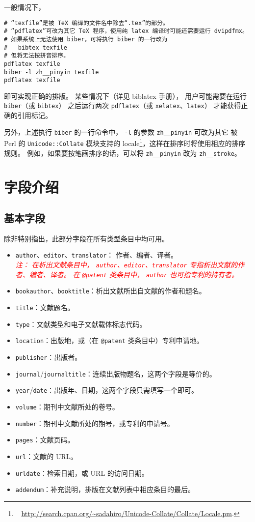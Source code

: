 \documentclass[UTF8, fancyhdr, hyperref]{ctexart}
\newcommand{\myemph}[1]{\emph{\textcolor{red}{#1}}}
\begin{document}
一般情况下，
\begin{Verbatim}[frame = single]
# “texfile”是被 TeX 编译的文件名中除去“.tex”的部分。
# “pdflatex”可改为其它 TeX 程序，使用纯 latex 编译时可能还需要运行 dvipdfmx。
# 如果系统上无法使用 biber，可将执行 biber 的一行改为
#   bibtex texfile
# 但将无法按拼音排序。
pdflatex texfile
biber -l zh__pinyin texfile
pdflatex texfile
\end{Verbatim}
即可实现正确的排版。
某些情况下（详见 biblatex 手册\supercite{biblatex}），
用户可能需要在运行 \verb|biber|（或 \verb|bibtex|）
之后运行两次 \verb|pdflatex|（或 \verb|xelatex|、\verb|latex|）
才能获得正确的引用标记。

另外，上述执行 \verb|biber| 的一行命令中，
\verb|-l| 的参数 \verb|zh__pinyin| 可改为其它
被 Perl 的 \verb|Unicode::Collate| 模块支持的 locale\footnote{\ %
	\url{http://search.cpan.org/~sadahiro/Unicode-Collate/Collate/Locale.pm}.%
}，这样在排序时将使用相应的排序规则。
例如，如果要按笔画排序的话，可以将 \verb|zh__pinyin| 改为 \verb|zh__stroke|。

\section{字段介绍}\label{sec:fields}
\subsection{基本字段}

除非特别指出，此部分字段在所有类型条目中均可用。

\begin{itemize}
	\item \verb|author|、\verb|editor|、\verb|translator|：
		作者、编者、译者。\\
		\myemph{%
			注：
			在析出文献条目中，
			\texttt{author}、\texttt{editor}、\texttt{translator}
			专指析出文献的作者、编者、译者。
			在 \texttt{@patent} 类条目中，
			\texttt{author} 也可指专利的持有者。%
		}
	\item \verb|bookauthor|、\verb|booktitle|：析出文献所出自文献的作者和题名。
	\item \verb|title|：文献题名。
	\item \verb|type|：文献类型和电子文献载体标志代码\supercite{gbt7714-2005}。
	\item \verb|location|：出版地，或（在 \verb|@patent| 类条目中）专利申请地。
	\item \verb|publisher|：出版者。
	\item \verb|journal|/\verb|journaltitle|：连续出版物题名，这两个字段是等价的。
	\item \verb|year|/\verb|date|：出版年、日期，这两个字段只需填写一个即可。
	\item \verb|volume|：期刊中文献所处的卷号。
	\item \verb|number|：期刊中文献所处的期号，或专利的申请号。
	\item \verb|pages|：文献页码。
	\item \verb|url|：文献的 URL。
	\item \verb|urldate|：检索日期，或 URL 的访问日期。
	\item \verb|addendum|：补充说明，排版在文献列表中相应条目的最后。
\end{itemize}
\end{document}
